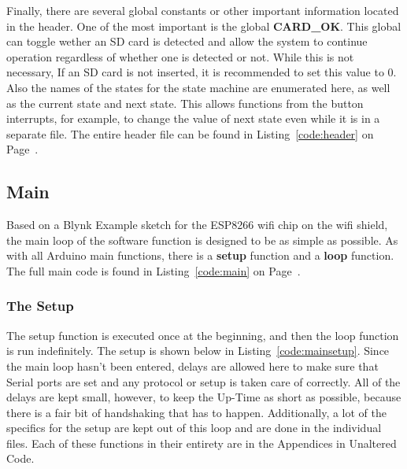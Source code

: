 \documentclass{article}
\begin{document}
Finally, there are several global constants or other important information located in the header. One of the most important is the global \textbf{CARD\_OK}. This global can toggle wether an SD card is detected and allow the system to continue operation regardless of whether one is detected or not. While this is not necessary, If an SD card is not inserted, it is recommended to set this value to 0. Also the names of the states for the state machine are enumerated here, as well as the current state and next state. This allows functions from the button interrupts, for example, to change the value of next state even while it is in a separate file. The entire header file can be found in Listing~\ref{code:header} on Page~\pageref{code:header}.

\subsection{Main}
Based on a Blynk Example sketch for the ESP8266 wifi chip on the wifi shield, the main loop of the software function is designed to be as simple as possible. As with all Arduino main functions, there is a \textbf{setup} function and a \textbf{loop} function. The full main code is found in Listing~\ref{code:main} on Page~\pageref{code:main}. 


\subsubsection{The Setup}

The setup function is executed once at the beginning, and then the loop function is run indefinitely. The setup is shown below in Listing~\ref{code:mainsetup}. Since the main loop hasn't been entered, delays are allowed here to make sure that Serial ports are set and any protocol or setup is taken care of correctly. All of the delays are kept small, however, to keep the Up-Time as short as possible, because there is a fair bit of handshaking that has to happen. Additionally, a lot of the specifics for the setup are kept out of this loop and are done in the individual files. Each of these functions in their entirety are in the Appendices in Unaltered Code. 
\end{document}
